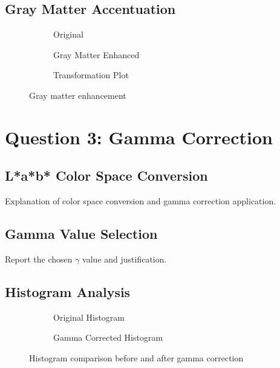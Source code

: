 \documentclass[12pt]{article}
\begin{document}
\subsection{Gray Matter Accentuation}
\begin{figure}[H]
    \centering
    \begin{subfigure}{0.3\textwidth}
        \fbox{\rule{0pt}{1.5in}\rule{1.5in}{0pt}}
        \caption{Original}
    \end{subfigure}
    \hfill
    \begin{subfigure}{0.3\textwidth}
        \fbox{\rule{0pt}{1.5in}\rule{1.5in}{0pt}}
        \caption{Gray Matter Enhanced}
    \end{subfigure}
    \hfill
    \begin{subfigure}{0.3\textwidth}
        \fbox{\rule{0pt}{1.5in}\rule{1.5in}{0pt}}
        \caption{Transformation Plot}
    \end{subfigure}
    \caption{Gray matter enhancement}
\end{figure}

\section{Question 3: Gamma Correction}
\subsection{L*a*b* Color Space Conversion}
Explanation of color space conversion and gamma correction application.

\subsection{Gamma Value Selection}
Report the chosen $\gamma$ value and justification.

\subsection{Histogram Analysis}
\begin{figure}[H]
    \centering
    \begin{subfigure}{0.45\textwidth}
        \fbox{\rule{0pt}{1.5in}\rule{2in}{0pt}}
        \caption{Original Histogram}
    \end{subfigure}
    \hfill
    \begin{subfigure}{0.45\textwidth}
        \fbox{\rule{0pt}{1.5in}\rule{2in}{0pt}}
        \caption{Gamma Corrected Histogram}
    \end{subfigure}
    \caption{Histogram comparison before and after gamma correction}
\end{figure}
\end{document}
